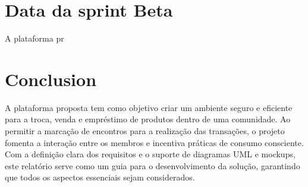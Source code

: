 \documentclass[a4paper, 12pt]{article} %
\begin{document}
\section*{Data da sprint Beta}

A plataforma pr

\newpage
\section*{Conclusion}

A plataforma proposta tem como objetivo criar um ambiente seguro e eficiente para a troca, venda e empréstimo de produtos dentro de uma comunidade. Ao permitir a marcação de encontros para a realização das transações, o projeto fomenta a interação entre os membros e incentiva práticas de consumo consciente. 
Com a definição clara dos requisitos e o suporte de diagramas UML e mockups, este relatório serve como um guia para o desenvolvimento da solução, garantindo que todos os aspectos essenciais sejam considerados.







\end{document}
